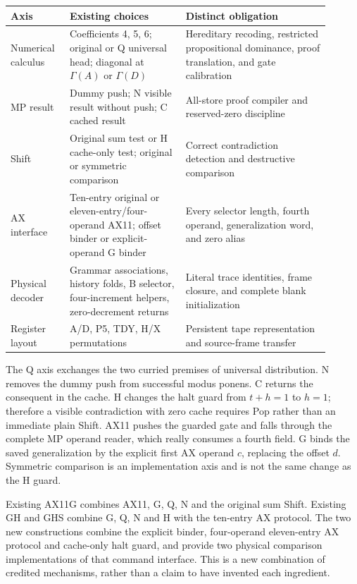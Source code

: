 \begin{center}\small
\setlength{\tabcolsep}{4pt}
\begin{tabular}{p{0.16\linewidth}p{0.33\linewidth}p{0.41\linewidth}}
\toprule Axis & Existing choices & Distinct obligation\\\midrule
Numerical calculus & Coefficients 4, 5, 6; original or Q universal head;
diagonal at $\Gamma(A)$ or $\Gamma(D)$ & Hereditary recoding, restricted
propositional dominance, proof translation, and gate calibration\\
MP result & Dummy push; N visible result without push; C cached result &
All-store proof compiler and reserved-zero discipline\\
Shift & Original sum test or H cache-only test; original or symmetric
comparison & Correct contradiction detection and destructive comparison\\
AX interface & Ten-entry original or eleven-entry/four-operand AX11;
offset binder or explicit-operand G binder & Every selector length,
fourth operand, generalization word, and zero alias\\
Physical decoder & Grammar associations, history folds, B selector,
four-increment helpers, zero-decrement returns & Literal trace identities,
frame closure, and complete blank initialization\\
Register layout & A/D, P5, TDY, H/X permutations & Persistent tape
representation and source-frame transfer\\\bottomrule
\end{tabular}\end{center}

The Q axis exchanges the two curried premises of universal distribution.
N removes the dummy push from successful modus ponens. C returns the
consequent in the cache. H changes the halt guard from $t+h=1$ to $h=1$;
therefore a visible contradiction with zero cache requires Pop rather
than an immediate plain Shift. AX11 pushes the guarded gate and falls
through the complete MP operand reader, which really consumes a fourth
field. G binds the saved generalization by the explicit first AX operand
$c$, replacing the offset $d$. Symmetric comparison is an implementation
axis and is not the same change as the H guard.

Existing AX11G combines AX11, G, Q, N and the original sum Shift. Existing
GH and GHS combine G, Q, N and H with the ten-entry AX protocol. The two
new constructions combine the explicit binder, four-operand eleven-entry
AX protocol and cache-only halt guard, and provide two physical comparison
implementations of that command interface. This is a new combination of
credited mechanisms, rather than a claim to have invented each ingredient.

